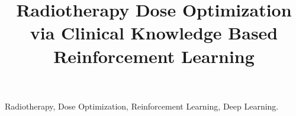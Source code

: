 \documentclass{midl} %
\title[Radiotherapy Optimization with Clinical Knowledge]{Radiotherapy Dose Optimization via Clinical Knowledge Based Reinforcement Learning}
\begin{document}
\maketitle

\begin{abstract}
	
\end{abstract}

\begin{keywords}
	Radiotherapy, Dose Optimization, Reinforcement Learning, Deep Learning.
\end{keywords}





\end{document}
